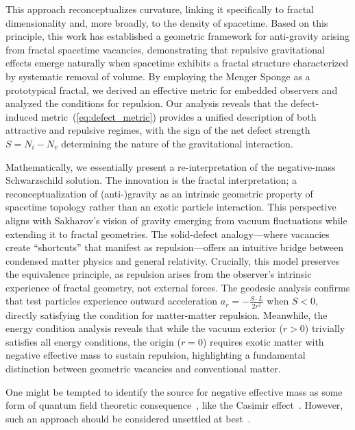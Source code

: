 \documentclass[%
  reprint,
  superscriptaddress,
  showpacs,
  showkeys,
  amsmath,amssymb,
  pra,
  longbibliography,
  floatfix,
]{revtex4-2}
\begin{document}
This approach reconceptualizes curvature, linking it specifically to fractal dimensionality and, more broadly, to the density of spacetime.
Based on this principle, this work has established a geometric framework for anti-gravity arising from fractal spacetime vacancies,
demonstrating that repulsive gravitational effects emerge naturally when spacetime exhibits a fractal structure characterized by systematic removal of volume. By employing the Menger Sponge as a prototypical fractal, we derived an effective metric for embedded observers and analyzed the conditions for repulsion. Our analysis reveals that the defect-induced metric~(\ref{eq:defect_metric}) provides a unified description of both attractive and repulsive regimes, with the sign of the net defect strength $S = N_i - N_v$ determining the nature of the gravitational interaction.

Mathematically, we essentially present a re-interpretation of the negative-mass Schwarzschild solution.
The innovation is the fractal interpretation;
a reconceptualization of (anti-)gravity as an intrinsic geometric property of spacetime topology rather than an exotic particle interaction.
This perspective aligns with Sakharov's vision of gravity emerging from vacuum fluctuations while extending it to fractal geometries.
The solid-defect analogy---where vacancies create ``shortcuts'' that manifest as repulsion---offers an intuitive bridge between condensed matter physics and general relativity. Crucially, this model preserves the equivalence principle, as repulsion arises from the observer's intrinsic experience of fractal geometry, not external forces. The geodesic analysis confirms that test particles experience outward acceleration $a_r = -\frac{S \cdot L}{2r^2}$ when $S < 0$, directly satisfying the condition for matter-matter repulsion. Meanwhile, the energy condition analysis reveals that while the vacuum exterior ($r > 0$) trivially satisfies all energy conditions, the origin ($r = 0$) requires exotic matter with negative effective mass to sustain repulsion, highlighting a fundamental distinction between geometric vacancies and conventional matter.

One might be tempted to identify the source for negative effective mass as some form of quantum field theoretic consequence~\cite{kontou-2020},
like the Casimir effect~\cite{bekenstein-2013,costa-2022}.
However, such an approach should be considered unsettled at best~\cite{Santiago22-PhysRevD.105.064038}.
\end{document}
